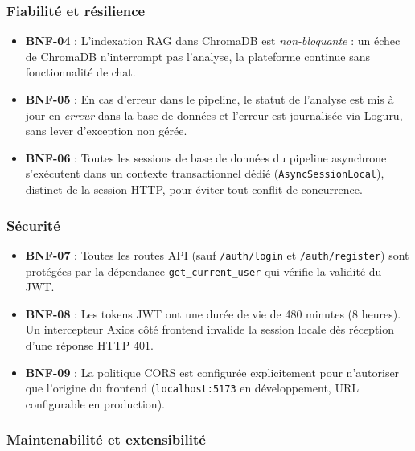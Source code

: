 \subsubsection*{Fiabilité et résilience}

\begin{itemize}
  \item \textbf{BNF-04} : L'indexation RAG dans ChromaDB est
    \textit{non-bloquante} : un échec de ChromaDB n'interrompt pas
    l'analyse, la plateforme continue sans fonctionnalité de chat.
  \item \textbf{BNF-05} : En cas d'erreur dans le pipeline, le statut
    de l'analyse est mis à jour en \textit{erreur} dans la base de
    données et l'erreur est journalisée via Loguru, sans lever
    d'exception non gérée.
  \item \textbf{BNF-06} : Toutes les sessions de base de données du
    pipeline asynchrone s'exécutent dans un contexte transactionnel
    dédié (\texttt{AsyncSessionLocal}), distinct de la session HTTP,
    pour éviter tout conflit de concurrence.
\end{itemize}

\subsubsection*{Sécurité}

\begin{itemize}
  \item \textbf{BNF-07} : Toutes les routes API (sauf \texttt{/auth/login}
    et \texttt{/auth/register}) sont protégées par la dépendance
    \texttt{get\_current\_user} qui vérifie la validité du JWT.
  \item \textbf{BNF-08} : Les tokens JWT ont une durée de vie de 480
    minutes (8 heures). Un intercepteur Axios côté frontend invalide la
    session locale dès réception d'une réponse HTTP 401.
  \item \textbf{BNF-09} : La politique CORS est configurée explicitement
    pour n'autoriser que l'origine du frontend (\texttt{localhost:5173}
    en développement, URL configurable en production).
\end{itemize}

\subsubsection*{Maintenabilité et extensibilité}

